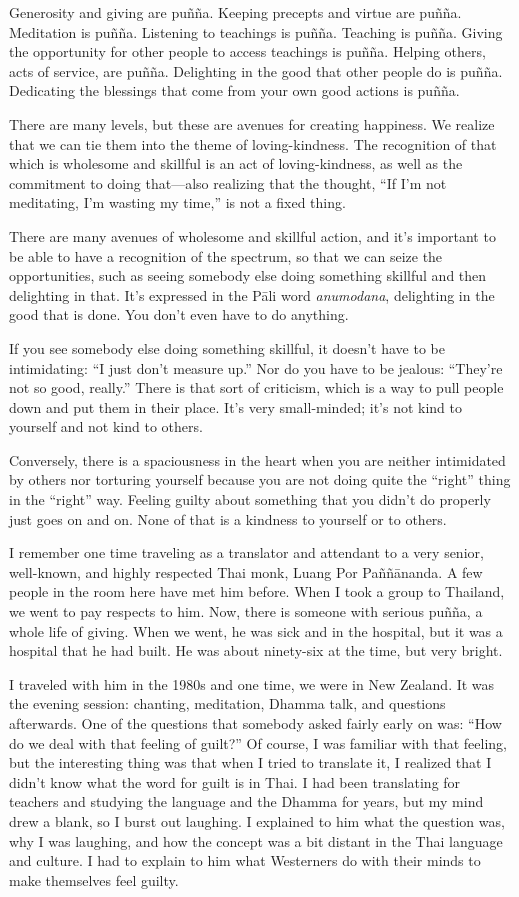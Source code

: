 Generosity and giving are puñña. Keeping precepts and virtue are puñña.
Meditation is puñña. Listening to teachings is puñña. Teaching is puñña.
Giving the opportunity for other people to access teachings is puñña.
Helping others, acts of service, are puñña. Delighting in the good that
other people do is puñña. Dedicating the blessings that come from your
own good actions is puñña.

There are many levels, but these are avenues for creating happiness. We
realize that we can tie them into the theme of loving-kindness. The
recognition of that which is wholesome and skillful is an act of
loving-kindness, as well as the commitment to doing that—also realizing
that the thought, “If I’m not meditating, I’m wasting my time,” is not a
fixed thing.

There are many avenues of wholesome and skillful action, and it’s
important to be able to have a recognition of the spectrum, so that we
can seize the opportunities, such as seeing somebody else doing
something skillful and then delighting in that. It’s expressed in the
Pāli word \emph{anumodana}, delighting in the good that is done. You
don’t even have to do anything.

If you see somebody else doing something skillful, it doesn’t have to be
intimidating: “I just don’t measure up.” Nor do you have to be jealous:
“They’re not so good, really.” There is that sort of criticism, which is
a way to pull people down and put them in their place. It’s very
small-minded; it’s not kind to yourself and not kind to others.

Conversely, there is a spaciousness in the heart when you are neither
intimidated by others nor torturing yourself because you are not doing
quite the “right” thing in the “right” way. Feeling guilty about
something that you didn’t do properly just goes on and on. None of that
is a kindness to yourself or to others.

I remember one time traveling as a translator and attendant to a very
senior, well-known, and highly respected Thai monk, Luang Por
Paññānanda. A few people in the room here have met him before. When I
took a group to Thailand, we went to pay respects to him. Now, there is
someone with serious puñña, a whole life of giving. When we went, he was
sick and in the hospital, but it was a hospital that he had built. He
was about ninety-six at the time, but very bright.

I traveled with him in the 1980s and one time, we were in New Zealand.
It was the evening session: chanting, meditation, Dhamma talk, and
questions afterwards. One of the questions that somebody asked fairly
early on was: “How do we deal with that feeling of guilt?” Of course, I
was familiar with that feeling, but the interesting thing was that when
I tried to translate it, I realized that I didn’t know what the word for
guilt is in Thai. I had been translating for teachers and studying the
language and the Dhamma for years, but my mind drew a blank, so I burst
out laughing. I explained to him what the question was, why I was
laughing, and how the concept was a bit distant in the Thai language and
culture. I had to explain to him what Westerners do with their minds to
make themselves feel guilty.

